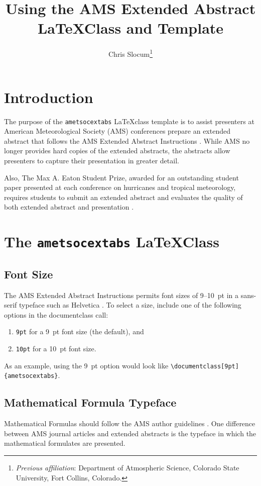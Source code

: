 \documentclass[9pt]{ametsocextabs}
\title{Using the AMS Extended Abstract \LaTeX Class and Template}
\author{Chris Slocum\aff{a}\thanks{\textit{Previous affiliation}: Department of Atmospheric Science, Colorado State University, Fort Collins, Colorado.}\correspondingauthor{Chris Slocum, \url{https://github.com/CSlocumWX/}}
}
\affiliation{\aff{a}{Fort Collins, Colorado}}
\begin{document}
\maketitle
\section{Introduction}
The purpose of the \lowercase{\texttt{ametsocextabs}} \LaTeX class
template is to assist presenters at American Meteorological Society
(AMS) conferences prepare an extended abstract that follows the AMS
Extended Abstract Instructions \citep{AMS2025abs}. While AMS no
longer provides hard copies of the extended abstracts, the abstracts
allow presenters to capture their presentation in greater detail.

Also, The Max A. Eaton Student Prize, awarded for an outstanding
student paper presented at each conference on hurricanes and tropical
meteorology, requires students to submit an extended abstract and
evaluates the quality of both extended abstract and presentation
\citep{AMS2025student, AMS2025Eaton}.

\section{The \lowercase{\texttt{ametsocextabs}} \LaTeX Class}

\subsection{Font Size}

The AMS Extended Abstract Instructions permits font sizes of 9--10~pt
in a sans-serif typeface such as Helvetica \citep{AMS2025abs}.
To select a size, include one of the following options in the
documentclass call:
\begin{enumerate}
    \item \texttt{9pt} for a 9~pt font size (the default), and
    \item \texttt{10pt} for a 10~pt font size.
\end{enumerate}
As an example, using the 9~pt option would look like
\texttt{\textbackslash documentclass[9pt]\{ametsocextabs\}}.

\subsection{Mathematical Formula Typeface}
Mathematical Formulas should follow the AMS author guidelines
\citep{AMS2025math}. One difference between AMS journal articles
and extended abstracts is the typeface in which the mathematical
formulates are presented.
\end{document}
